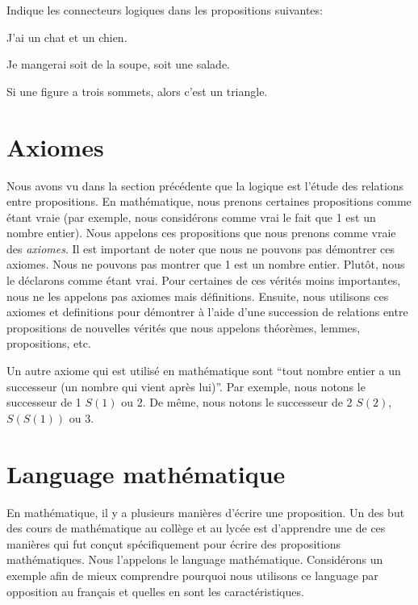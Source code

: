 \begin{exercice}
    Indique les connecteurs logiques dans les propositions suivantes:
    \begin{exerciceenumnoeq}
        \item J'ai un chat et un chien.
        \item Je mangerai soit de la soupe, soit une salade.
        \item Si une figure a trois sommets, alors c'est un triangle.
    \end{exerciceenumnoeq}
\end{exercice}

\section{Axiomes}

Nous avons vu dans la section précédente que la logique est l'étude des relations entre propositions. En mathématique, nous prenons certaines propositions comme étant vraie (par exemple, nous considérons comme vrai le fait que 1 est un nombre entier). Nous appelons ces propositions que nous prenons comme vraie des {\em axiomes}. Il est important de noter que nous ne pouvons pas démontrer ces axiomes. Nous ne pouvons pas montrer que 1 est un nombre entier. Plutôt, nous le déclarons comme étant vrai. Pour certaines de ces vérités moins importantes, nous ne les appelons pas axiomes mais définitions. Ensuite, nous utilisons ces axiomes et definitions pour démontrer à l'aide d'une succession de relations entre propositions de nouvelles vérités que nous appelons théorèmes, lemmes, propositions, etc.

\begin{exemple}\label{concepts_de_base:axiomes_ex}
    Un autre axiome qui est utilisé en mathématique sont ``tout nombre entier a un successeur (un nombre qui vient après lui)''. Par exemple, nous notons le successeur de 1 $S(1)$ ou 2. De même, nous notons le successeur de 2 $S(2)$, $S(S(1))$ ou 3.
\end{exemple}



\section{Language mathématique}

En mathématique, il y a plusieurs manières d'écrire une proposition. Un des but des cours de mathématique au collège et au lycée est d'apprendre une de ces manières qui fut conçut spécifiquement pour écrire des propositions mathématiques. Nous l'appelons le language mathématique. Considérons un exemple afin de mieux comprendre pourquoi nous utilisons ce language par opposition au français et quelles en sont les caractéristiques.

